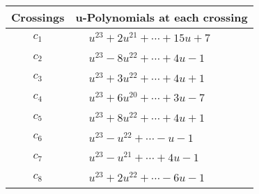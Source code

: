 \documentclass[1p]{elsarticle_modified}
\theoremstyle{definition}
\begin{document}
\begin{tabular}{m{50pt}|m{274pt}}
Crossings & \hspace{64pt}u-Polynomials at each crossing \\
\hline $$\begin{aligned}c_{1}\end{aligned}$$&$\begin{aligned}
&u^{23}+2 u^{21}+\cdots+15 u+7
\end{aligned}$\\
\hline $$\begin{aligned}c_{2}\end{aligned}$$&$\begin{aligned}
&u^{23}-8 u^{22}+\cdots+4 u-1
\end{aligned}$\\
\hline $$\begin{aligned}c_{3}\end{aligned}$$&$\begin{aligned}
&u^{23}+3 u^{22}+\cdots+4 u+1
\end{aligned}$\\
\hline $$\begin{aligned}c_{4}\end{aligned}$$&$\begin{aligned}
&u^{23}+6 u^{20}+\cdots+3 u-7
\end{aligned}$\\
\hline $$\begin{aligned}c_{5}\end{aligned}$$&$\begin{aligned}
&u^{23}+8 u^{22}+\cdots+4 u+1
\end{aligned}$\\
\hline $$\begin{aligned}c_{6}\end{aligned}$$&$\begin{aligned}
&u^{23}- u^{22}+\cdots- u-1
\end{aligned}$\\
\hline $$\begin{aligned}c_{7}\end{aligned}$$&$\begin{aligned}
&u^{23}- u^{21}+\cdots+4 u-1
\end{aligned}$\\
\hline $$\begin{aligned}c_{8}\end{aligned}$$&$\begin{aligned}
&u^{23}+2 u^{22}+\cdots-6 u-1
\end{aligned}$\\

\end{tabular}
\end{document}
